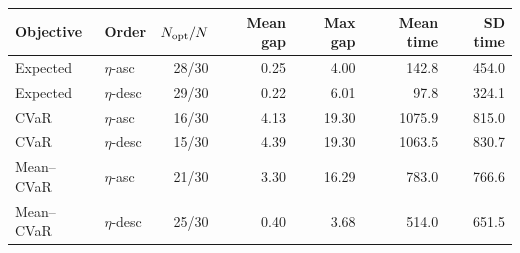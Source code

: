 \begin{tabular}{llrrrrr}
\toprule
Objective & Order & $N_{\rm opt}/N$ & Mean gap & Max gap & Mean time & SD time \\
\midrule
Expected & $\eta$-asc & 28/30 & 0.25 & 4.00 & 142.8 & 454.0 \\
Expected & $\eta$-desc & 29/30 & 0.22 & 6.01 & 97.8 & 324.1 \\
\midrule
CVaR & $\eta$-asc & 16/30 & 4.13 & 19.30 & 1075.9 & 815.0 \\
CVaR & $\eta$-desc & 15/30 & 4.39 & 19.30 & 1063.5 & 830.7 \\
\midrule
Mean--CVaR & $\eta$-asc & 21/30 & 3.30 & 16.29 & 783.0 & 766.6 \\
Mean--CVaR & $\eta$-desc & 25/30 & 0.40 & 3.68 & 514.0 & 651.5 \\
\bottomrule
\end{tabular}
